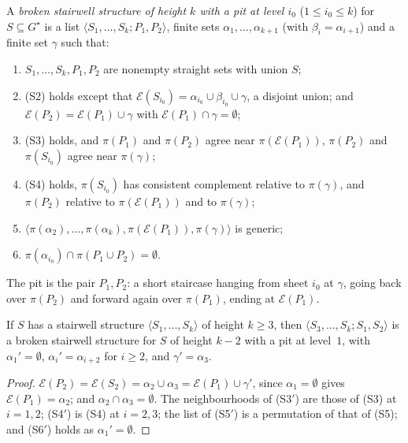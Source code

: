 \begin{definition}\label{def:broken}
A \emph{broken stairwell structure of height $k$ with a pit at level $i_0$} ($1\le i_0\le k$) for $S\subseteq G^\star$ is a list $\langle S_1,\dots,S_k;P_1,P_2\rangle$, finite sets
$\alpha_1,\dots,\alpha_{k+1}$ (with $\beta_i=\alpha_{i+1}$) and a finite set $\gamma$ such that:
\begin{enumerate}[label=(S\arabic*$'$)]
\item $S_1,\dots,S_k,P_1,P_2$ are nonempty straight sets with union $S$;
\item (S2) holds except that $\mathcal E(S_{i_0})=\alpha_{i_0}\cup\beta_{i_0}\cup\gamma$, a disjoint union; and $\mathcal E(P_2)=\mathcal E(P_1)\cup\gamma$ with $\mathcal E(P_1)\cap\gamma=\emptyset$;
\item (S3) holds, and $\pi(P_1)$ and $\pi(P_2)$ agree near $\pi(\mathcal E(P_1))$, $\pi(P_2)$ and $\pi(S_{i_0})$ agree near $\pi(\gamma)$;
\item (S4) holds, $\pi(S_{i_0})$ has consistent complement relative to $\pi(\gamma)$, and $\pi(P_2)$ relative to $\pi(\mathcal E(P_1))$ and to $\pi(\gamma)$;
\item $\langle\pi(\alpha_2),\dots,\pi(\alpha_k),\pi(\mathcal E(P_1)),\pi(\gamma)\rangle$ is generic;
\item $\pi(\alpha_{i_0})\cap\pi(P_1\cup P_2)=\emptyset$.
\end{enumerate}
\end{definition}


The pit is the pair $P_1,P_2$: a short staircase hanging from sheet $i_0$ at $\gamma$, going back over $\pi(P_2)$ and forward again over $\pi(P_1)$, ending at $\mathcal E(P_1)$.

\begin{proposition}\label{prop:ho17}
If $S$ has a stairwell structure $\langle S_1,\dots,S_k\rangle$ of height $k\ge3$, then $\langle S_3,\dots,S_k;S_1,S_2\rangle$ is a broken stairwell structure for $S$ of height $k-2$ with a pit at level~$1$,
with $\alpha_1'=\emptyset$, $\alpha_i'=\alpha_{i+2}$ for $i\ge2$, and $\gamma'=\alpha_3$.
\end{proposition}

\begin{proof}
$\mathcal E(P_2)=\mathcal E(S_2)=\alpha_2\cup\alpha_3=\mathcal E(P_1)\cup\gamma'$, since $\alpha_1=\emptyset$ gives $\mathcal E(P_1)=\alpha_2$; and $\alpha_2\cap\alpha_3=\emptyset$. The neighbourhoods of (S3$'$) are those of
(S3) at $i=1,2$; (S4$'$) is (S4) at $i=2,3$; the list of (S5$'$) is a permutation of that of (S5); and (S6$'$) holds as $\alpha_1'=\emptyset$.
\end{proof}

